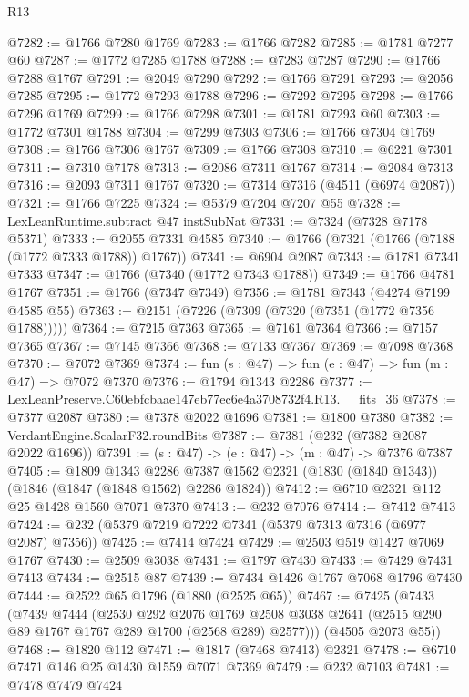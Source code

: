 \begin{lexlean}{R13}
\begin{coremodule}
@7282 := @1766 @7280 @1769
@7283 := @1766 @7282
@7285 := @1781 @7277 @60
@7287 := @1772 @7285 @1788
@7288 := @7283 @7287
@7290 := @1766 @7288 @1767
@7291 := @2049 @7290
@7292 := @1766 @7291
@7293 := @2056 @7285
@7295 := @1772 @7293 @1788
@7296 := @7292 @7295
@7298 := @1766 @7296 @1769
@7299 := @1766 @7298
@7301 := @1781 @7293 @60
@7303 := @1772 @7301 @1788
@7304 := @7299 @7303
@7306 := @1766 @7304 @1769
@7308 := @1766 @7306 @1767
@7309 := @1766 @7308
@7310 := @6221 @7301
@7311 := @7310 @7178
@7313 := @2086 @7311 @1767
@7314 := @2084 @7313
@7316 := @2093 @7311 @1767
@7320 := @7314 @7316 (@4511 (@6974 @2087))
@7321 := @1766 @7225
@7324 := @5379 @7204 @7207 @55
@7328 := LexLeanRuntime.subtract @47 instSubNat
@7331 := @7324 (@7328 @7178 @5371)
@7333 := @2055 @7331 @4585
@7340 := @1766 (@7321 (@1766 (@7188 (@1772 @7333 @1788)) @1767))
@7341 := @6904 @2087
@7343 := @1781 @7341 @7333
@7347 := @1766 (@7340 (@1772 @7343 @1788))
@7349 := @1766 @4781 @1767
@7351 := @1766 (@7347 @7349)
@7356 := @1781 @7343 (@4274 @7199 @4585 @55)
@7363 := @2151 (@7226 (@7309 (@7320 (@7351 (@1772 @7356 @1788)))))
@7364 := @7215 @7363
@7365 := @7161 @7364
@7366 := @7157 @7365
@7367 := @7145 @7366
@7368 := @7133 @7367
@7369 := @7098 @7368
@7370 := @7072 @7369
@7374 := fun (s : @47) => fun (e : @47) => fun (m : @47) => @7072 @7370
@7376 := @1794 @1343 @2286
@7377 := LexLeanPreserve.C60ebfcbaae147eb77ec6e4a3708732f4.R13.__fits_36
@7378 := @7377 @2087
@7380 := @7378 @2022 @1696
@7381 := @1800 @7380
@7382 := VerdantEngine.ScalarF32.roundBits
@7387 := @7381 (@232 (@7382 @2087 @2022 @1696))
@7391 := (s : @47) -> (e : @47) -> (m : @47) -> @7376 @7387
@7405 := @1809
    @1343
    @2286
    @7387
    @1562
    @2321
    (@1830 (@1840 @1343))
    (@1846 (@1847 (@1848 @1562) @2286 @1824))
@7412 := @6710 @2321 @112 @25 @1428 @1560 @7071 @7370
@7413 := @232 @7076
@7414 := @7412 @7413
@7424 := @232 (@5379 @7219 @7222 @7341 (@5379 @7313 @7316 (@6977 @2087) @7356))
@7425 := @7414 @7424
@7429 := @2503 @519 @1427 @7069 @1767
@7430 := @2509 @3038
@7431 := @1797 @7430
@7433 := @7429 @7431 @7413
@7434 := @2515 @87
@7439 := @7434 @1426 @1767 @7068 @1796 @7430
@7444 := @2522 @65 @1796 (@1880 (@2525 @65))
@7467 := @7425
    (@7433
      (@7439
        @7444
        (@2530
          @292
          @2076
          @1769
          @2508
          @3038
          @2641
          (@2515 @290 @89 @1767 @1767 @289 @1700 (@2568 @289) @2577)))
      (@4505 @2073 @55))
@7468 := @1820 @112
@7471 := @1817 (@7468 @7413) @2321
@7478 := @6710 @7471 @146 @25 @1430 @1559 @7071 @7369
@7479 := @232 @7103
@7481 := @7478 @7479 @7424

\end{coremodule}
\end{lexlean}
